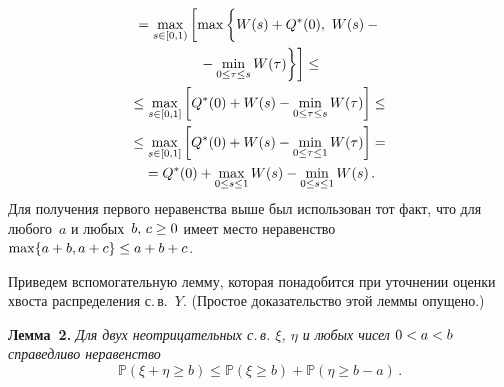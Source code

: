 \begin{multicols}{2}
\noindent
\begin{multline}
{}=\max\limits_{s \in [0,1)} \left[ \max\left\{  
\vphantom{\max\limits_{s \in [0,1)}}
W(s)+Q^*(0),\,\,W(s)-{}\right.\right.\\
\left.\left.{}-\min\limits_{0\leq \tau \leq s}W(\tau) \right\} \right]\leq{}\\
{}\leq \max\limits_{s \in [0,1]} \left[ Q^*(0)+W(s)-\min_{0 \leq \tau \leq s}W(\tau) \right]
\leq{}\\
{}\leq \max\limits_{s \in [0,1]} \left[ Q^*(0)+W(s)-\min_{0 \leq \tau
\leq 1}W(\tau) \right]={}\\
{}= Q^*(0)+\max\limits_{0 \leq s \leq 1}W(s)-\min_{0 \leq s \leq 1} W(s)\,.
\label{asymp1-l5}
\end{multline}
Для получения первого неравенства выше был использован тот факт,
что для любого~$a$ и любых~$b,\,c\hm\ge 0$ имеет место неравенство
$\max\{a+b,a+c\}\hm\leq a+b+c$.

Приведем вспомогательную лемму, которая понадобится при уточнении
оценки  хвоста распределения с.\,в.~$Y$. (Простое доказательство этой
леммы опущено.)

\medskip

\noindent
\textbf{Лемма~2.} \textit{Для двух неотрицательных с.\,в. $\xi$, $\eta$ и любых чисел $0\hm<a\hm<b$
справедливо неравенство}
$$
\mathbb{P} (\xi+\eta \geq b) \leq \mathbb{P} (\xi \geq b)+ \mathbb{P} (\eta \geq b-a)\,.
$$

\smallskip


\end{multicols}
